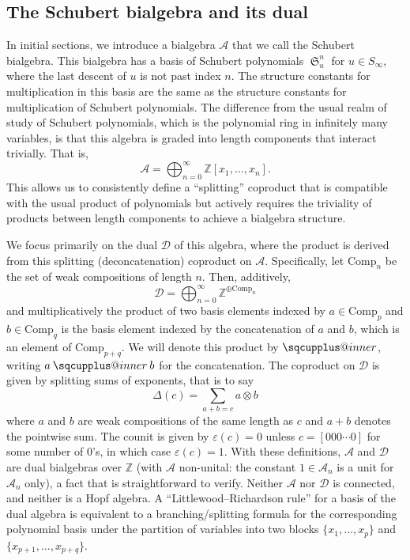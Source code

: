 \documentclass{amsart}
\makeatletter
\newcommand{\sqcupplus@inner}[2]{%
  \vcenter{\hbox{\ooalign{%
    \hfil$\m@th#1\sqcup$\hfil\cr
    \hfil\raisebox{0.15ex}{$\m@th#1\scriptscriptstyle+$}\hfil\cr
  }}}%
}
\newcommand{\sqcupplus}{\mathbin{\mathpalette\sqcupplus@inner\relax}}
\theoremstyle{definition}
\theoremstyle{remark}
\numberwithin{equation}{subsection}
\DeclareMathOperator{\sch}{\mathfrak{S}}
\newcommand{\coma}{\mathcal{A}}
\newcommand{\dcoma}{\mathcal{D}}
\makeatother
\begin{document}
\subsection*{The Schubert bialgebra and its dual} In initial sections, we introduce a bialgebra $\coma$ that we call the Schubert bialgebra. This bialgebra has a basis of Schubert polynomials $\sch_u^n$ for $u\in S_\infty$, where the last descent of $u$ is not past index $n$. The structure constants for multiplication in this basis are the same as the structure constants for multiplication of Schubert polynomials. The difference from the usual realm of study of Schubert polynomials, which is the polynomial ring in infinitely many variables, is that this algebra is graded into length components that interact trivially. That is,
$$\coma = \bigoplus_{n=0}^\infty \mathbb{Z}[x_1,\ldots,x_n]\text{.}$$
This allows us to consistently define a ``splitting'' coproduct that is compatible with the usual product of polynomials but actively requires the triviality of products between length components to achieve a bialgebra structure.

We focus primarily on the dual $\dcoma$ of this algebra, where the product is derived from this splitting (deconcatenation) coproduct on $\coma$. Specifically, let $\mathrm{Comp}_n$ be the set of weak compositions of length $n$. Then, additively,
$$\dcoma = \bigoplus_{n=0}^\infty \mathbb{Z}^{\oplus \mathrm{Comp}_n}$$
and multiplicatively the product of two basis elements indexed by $a\in \mathrm{Comp}_p$ and $b\in \mathrm{Comp}_q$ is the basis element indexed by the concatenation of $a$ and $b$, which is an element of $\mathrm{Comp}_{p+q}$. We will denote this product by $\sqcupplus$, writing $a\sqcupplus b$ for the concatenation. The coproduct on $\dcoma$ is given by splitting sums of exponents, that is to say
$$\Delta(c) = \sum_{a+b=c} a\otimes b$$
where $a$ and $b$ are weak compositions of the same length as $c$ and $a+b$ denotes the pointwise sum. The counit is given by $\varepsilon(c)=0$ unless $c=[000\cdots 0]$ for some number of $0$'s, in which case $\varepsilon(c)=1$. With these definitions, $\coma$ and $\dcoma$ are dual bialgebras over $\mathbb{Z}$ (with $\coma$ non-unital: the constant $1\in\coma_n$ is a unit for $\coma_n$ only), a fact that is straightforward to verify. Neither $\coma$ nor $\dcoma$ is connected, and neither is a Hopf algebra. A ``Littlewood--Richardson rule'' for a basis of the dual algebra is equivalent to a branching/splitting formula for the corresponding polynomial basis under the partition of variables into two blocks $\{x_1,\ldots,x_p\}$ and $\{x_{p+1},\ldots,x_{p+q}\}$.
\end{document}
